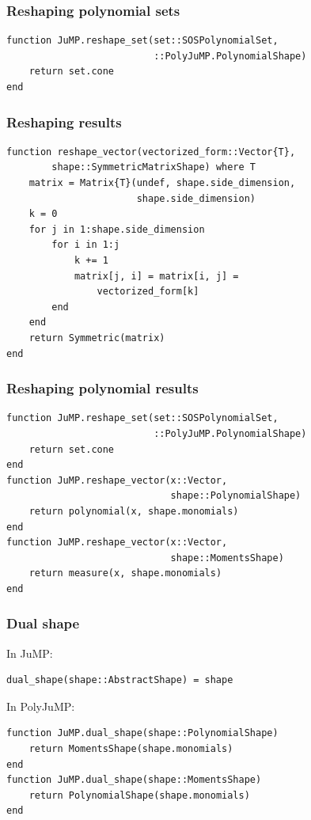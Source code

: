 \documentclass{beamer}
\begin{document}
\begin{frame}[fragile]
  \frametitle{Reshaping polynomial sets}
\begin{verbatim}
function JuMP.reshape_set(set::SOSPolynomialSet,
                          ::PolyJuMP.PolynomialShape)
    return set.cone
end
\end{verbatim}
\end{frame}

\begin{frame}[fragile]
  \frametitle{Reshaping results}
\begin{verbatim}
function reshape_vector(vectorized_form::Vector{T},
        shape::SymmetricMatrixShape) where T
    matrix = Matrix{T}(undef, shape.side_dimension,
                       shape.side_dimension)
    k = 0
    for j in 1:shape.side_dimension
        for i in 1:j
            k += 1
            matrix[j, i] = matrix[i, j] =
                vectorized_form[k]
        end
    end
    return Symmetric(matrix)
end
\end{verbatim}
\end{frame}

\begin{frame}[fragile]
  \frametitle{Reshaping polynomial results}
\begin{verbatim}
function JuMP.reshape_set(set::SOSPolynomialSet,
                          ::PolyJuMP.PolynomialShape)
    return set.cone
end
function JuMP.reshape_vector(x::Vector,
                             shape::PolynomialShape)
    return polynomial(x, shape.monomials)
end
function JuMP.reshape_vector(x::Vector,
                             shape::MomentsShape)
    return measure(x, shape.monomials)
end
\end{verbatim}
\end{frame}

\begin{frame}[fragile]
  \frametitle{Dual shape}
  In JuMP:
\begin{verbatim}
dual_shape(shape::AbstractShape) = shape
\end{verbatim}
  In PolyJuMP:
\begin{verbatim}
function JuMP.dual_shape(shape::PolynomialShape)
    return MomentsShape(shape.monomials)
end
function JuMP.dual_shape(shape::MomentsShape)
    return PolynomialShape(shape.monomials)
end
\end{verbatim}
\end{frame}
\end{document}
